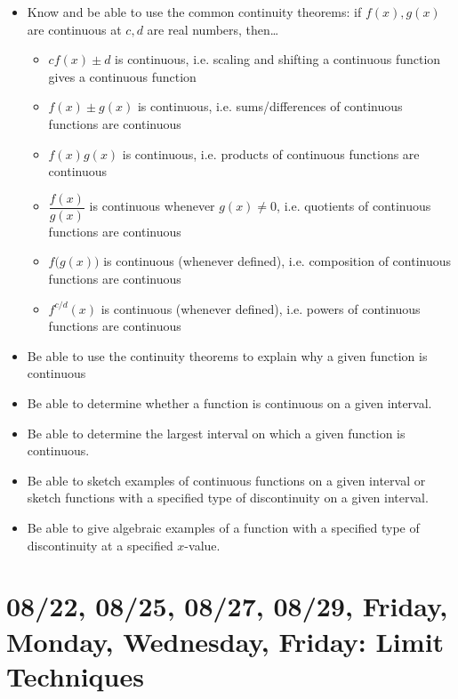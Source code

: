 \documentclass[11pt,letterpaper]{article}
\begin{document}
\begin{itemize}
\item Know and be able to use the common continuity theorems: if $f(x), g(x)$ are continuous at $c, d$ are real numbers, then\dots
	\begin{itemize}
	\item $c f(x) \pm d$ is continuous, i.e. scaling and shifting a continuous function gives a continuous function
	\item $f(x) \pm g(x)$ is continuous, i.e. sums/differences of continuous functions are continuous
	\item $f(x) g(x)$ is continuous, i.e. products of continuous functions are continuous 
	\item $\dfrac{f(x)}{g(x)}$ is continuous whenever $g(x) \neq 0$, i.e. quotients of continuous functions are continuous
	\item $f \big( g(x) \big)$ is continuous (whenever defined), i.e. composition of continuous functions are continuous
	\item $f^{c/d}(x)$ is continuous (whenever defined), i.e. powers of continuous functions are continuous 
	\end{itemize}

\item Be able to use the continuity theorems to explain why a given function is continuous 

\item Be able to determine whether a function is continuous on a given interval.

\item Be able to determine the largest interval on which a given function is continuous. 

\item Be able to sketch examples of continuous functions on a given interval or sketch functions with a specified type of discontinuity on a given interval. 

\item Be able to give algebraic examples of a function with a specified type of discontinuity at a specified $x$-value. 
\end{itemize}

\newpage
\section*{08/22, 08/25, 08/27, 08/29, Friday, Monday, Wednesday, Friday: Limit Techniques\label{08-22--08-29}}
\end{document}
